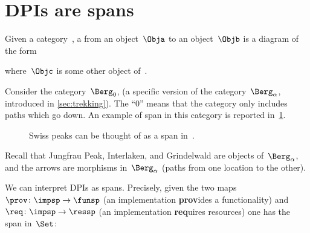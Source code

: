 
\section{DPIs are spans}
\label{sec:spans}

\begin{ctdefinition}[Span]
	\label{def:span}
	Given a category~\CatC, a \emph{} from an object~$\Obja$ to an object~$\Objb$ is a diagram of the form
	\begin{center}
	\end{center}
	where~$\Objc$ is some other object of~\CatC.
\end{ctdefinition}

\begin{example}

	Consider the category~$\Berg_0$, (a specific version of the category~$\Berg_\alpha$, introduced in \cref{sec:trekking}).
	The ``0'' means that the category only includes paths which go down.
	An example of span in this category is reported in~\cref{fig:exmountains}.
	\begin{figure}[h!]
		\centering
		\caption{Swiss peaks can be thought of as a span in~\Berg.}
		\label{fig:exmountains}
	\end{figure}
	Recall that \textsf{Jungfrau Peak}, \textsf{Interlaken}, and \textsf{Grindelwald} are objects of~$\Berg_\alpha$, and the arrows are morphisms in~$\Berg_\alpha$ (paths from one location to the other).
\end{example}

We can interpret DPIs as spans.
Precisely, given the two maps~$\prov \colon \impsp \to \funsp$ (an implementation \textbf{prov}ides a functionality) and~$\req\colon \impsp \to \ressp$ (an implementation \textbf{req}uires resources) one has the span in~$\Set$:
\begin{center}
\end{center}

